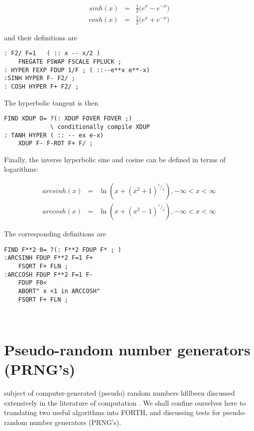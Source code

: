 \begin{eqnarray*}
    sinh(x) & = & \frac{1}{2}\Big(e^x-e^{-x}\Big)\label{hyp_eqn} \\
    cosh(x) & = & \frac{1}{2}\Big(e^x+e^{-x}\Big) 
\end{eqnarray*}


and their definitions are
\begin{verbatim}
: F2/ F=1   ( :: x -- x/2 ) 
    FNEGATE FSWAP FSCALE FPLUCK ;
: HYPER FEXP FDUP 1/F ; ( ::--e**x e**-x)
:SINH HYPER F- F2/ ;
: COSH HYPER F+ F2/ ;
\end{verbatim}

The hyperbolic tangent is then

\begin{verbatim}
FIND XDUP O= ?(: XDUP FOVER FOVER ;)
             \ conditionally compile XDUP
: TANH HYPER ( :: -- ex e-x)
    XDUP F- F-ROT F+ F/ ;
\end{verbatim}

Finally, the inverse hyperbolic sine and cosine can be defined in
terms of logarithms:

\begin{eqnarray*}
    arcsinh(x) & = & \ln{(x + (x^2 + 1)^{^1/_2})} , -\infty < x < \infty \\
    arccosh(x) & = & \ln{(x + (x^2 - 1)^{^1/_2})} , -\infty < x < \infty
\end{eqnarray*}

The corresponding definitions are 


\begin{verbatim}
FIND F**2 0= ?(: F**2 FDUP F* ; )
:ARCSINH FDUP F**2 F=1 F+
    FSQRT F+ FLN ;
:ARCCOSH FDUP F**2 F=1 F-
    FDUP F0<
    ABORT" x <1 in ARCCOSH"
    FSQRT F+ FLN ;

 
\end{verbatim}




\section{Pseudo-random number generators (PRNG's)}
 subject of computer-generated (pseudo) random numbers
hfilbeen discussed extensively in the literature of computation 
  . We shall
confine ourselves here to translating two useful
algorithms into FORTH, and discussing tests for pseudo-random
number generators (PRNG's).

